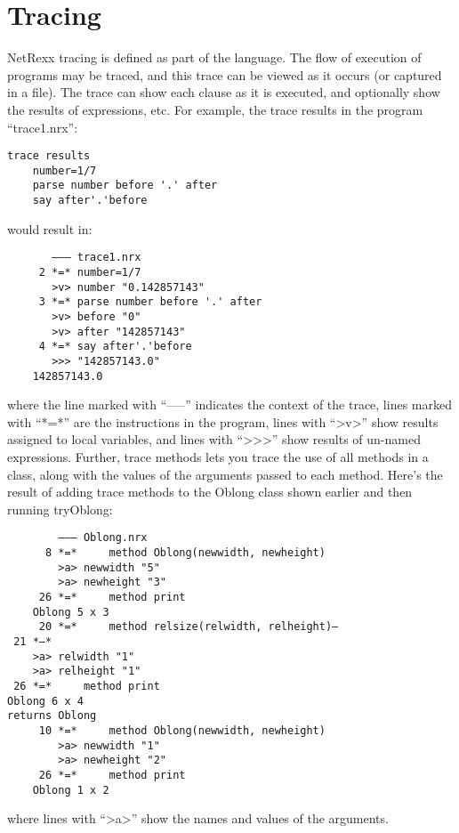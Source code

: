 \section{Tracing}
NetRexx tracing is defined as part of the language. The flow of
execution of programs may be traced, and this trace can be viewed as
it occurs (or captured in a file). The trace can show each clause as
it is executed, and optionally show the results of expressions,
etc. For example, the trace results in the program “trace1.nrx”:
\begin{lstlisting}[label=trace,caption=Trace]
    trace results
    number=1/7
    parse number before '.' after
    say after'.'before
\end{lstlisting}
would result in:
\begin{verbatim}
       ––– trace1.nrx
     2 *=* number=1/7
       >v> number "0.142857143"
     3 *=* parse number before '.' after
       >v> before "0"
       >v> after "142857143"
     4 *=* say after'.'before
       >>> "142857143.0"
    142857143.0
\end{verbatim}
where the line marked with “–––” indicates the context of the trace, lines marked with “*=*” are the instructions in the program, lines with “>v>” show results assigned to local variables, and lines with “>>>” show results of un-named expressions.
Further, trace methods lets you trace the use of all methods in a
class, along with the values of the arguments passed to each
method. Here’s the result of adding trace methods to the Oblong class
shown earlier and then running tryOblong:
\begin{verbatim}
        ––– Oblong.nrx
      8 *=*     method Oblong(newwidth, newheight)
        >a> newwidth "5"
        >a> newheight "3"
     26 *=*     method print
    Oblong 5 x 3
     20 *=*     method relsize(relwidth, relheight)–
 21 *–*
    >a> relwidth "1"
    >a> relheight "1"
 26 *=*     method print
Oblong 6 x 4
returns Oblong
     10 *=*     method Oblong(newwidth, newheight)
        >a> newwidth "1"
        >a> newheight "2"
     26 *=*     method print
    Oblong 1 x 2
\end{verbatim}
where lines with “>a>” show the names and values of the arguments.

